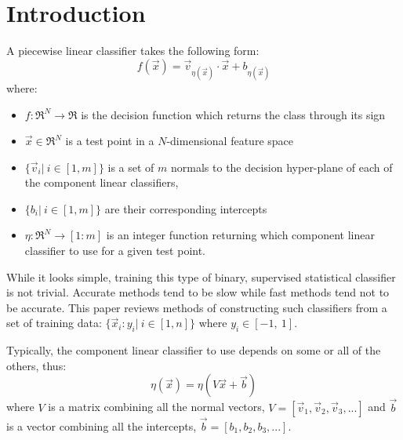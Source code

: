 \documentclass{article}
\newcommand{\decision}{f}
\newcommand{\testpoint}{\vec x}
\newcommand{\domainfunction}{\eta}
\newcommand{\normal}{v}
\newcommand{\constant}{b}
\newcommand{\dimension}{N}
\newcommand{\ndomain}{m}
\newcommand{\sample}{x}
\newcommand{\ord}{y}
\newcommand{\ntrain}{n}
\newcommand{\normals}{V}
\begin{document}
\section{Introduction}

A piecewise linear classifier takes the following form:
\begin{equation}
\decision(\testpoint) = \vec \normal_{\domainfunction(\testpoint)} \cdot \testpoint + \constant_{\domainfunction(\testpoint)}
\end{equation}
where:
\begin{itemize}
  \item $\decision:\Re^\dimension \rightarrow \Re$ is the decision function which returns the class through its sign
  \item $\testpoint \in \Re^\dimension$ is a test point in a 
	  $\dimension$-dimensional feature space
  \item $\lbrace \vec \normal_i|~ i \in [1,\ndomain] \rbrace$ is a set of $\ndomain$
	  normals to the decision hyper-plane of each of the 
	  component linear classifiers,
  \item $\lbrace \constant_i|~ i \in [1,\ndomain] \rbrace$ are their corresponding intercepts
  \item $\domainfunction:\Re^\dimension \rightarrow [1:\ndomain]$ is an integer
function returning which component linear classifier to use for a given
test point.
\end{itemize}

While it looks simple, training this type of binary, 
supervised statistical classifier is not trivial.
Accurate methods tend to be slow while fast methods tend not to be accurate.
This paper reviews methods of constructing such classifiers from a set of 
training data: $\lbrace \vec \sample_i : \ord_i|~ i \in [1, \ntrain] \rbrace$
where $\ord_i \in [-1,~ 1]$.

Typically, the component linear classifier to use depends on some or all of
the others, thus:
\begin{equation}
	\domainfunction(\testpoint) = \domainfunction(\normals \testpoint + \vec \constant)
\end{equation}
where $\normals$ is a matrix combining all the normal vectors,
$\normals=[ \vec \normal_1, \vec \normal_2, \vec \normal_3, ... ]$ and 
$\vec \constant$ is a vector combining all the intercepts,
$\vec \constant= [ \constant_1, \constant_2, \constant_3,... ]$.
\end{document}
